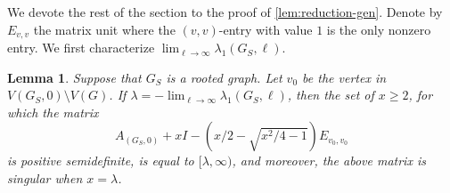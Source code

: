 \documentclass[11pt]{article}
\newtheorem{lemma}[theorem]{Lemma}
\theoremstyle{definition}
\theoremstyle{remark}
\newcommand{\la}{\lambda}
\begin{document}
We devote the rest of the section to the proof of \cref{lem:reduction-gen}. Denote by $E_{v,v}$ the matrix unit where the $(v,v)$-entry with value $1$ is the only nonzero entry. We first characterize $\lim_{\ell \to \infty}\la_1(G_S, \ell)$.

\begin{lemma} \label{lem:lim-smallest-ev}
    Suppose that $G_S$ is a rooted graph. Let $v_0$ be the vertex in $V(G_S,0)\setminus V(G)$. If $\la = -\lim_{\ell\to\infty}\la_1(G_S,\ell)$, then the set of $x \ge 2$, for which the matrix
    \begin{equation} \label{eqn:matrix-gs}
        A_{(G_S,0)} + xI - \left(x/2 - \sqrt{x^2/4-1}\right)E_{v_0,v_0}
    \end{equation}
    is positive semidefinite, is equal to $[\la, \infty)$, and moreover, the above matrix is singular when $x = \la$.
\end{lemma}
\end{document}
